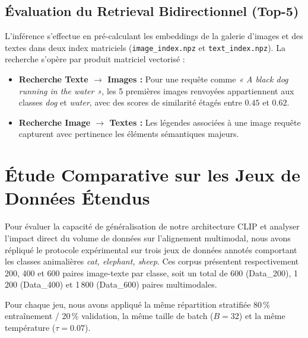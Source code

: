 \documentclass[12pt,a4paper]{article}
\begin{document}

\subsection{Évaluation du Retrieval Bidirectionnel (Top-5)}
L'inférence s'effectue en pré-calculant les embeddings de la galerie d'images et des textes dans deux index matriciels (\texttt{image\_index.npz} et \texttt{text\_index.npz}). La recherche s'opère par produit matriciel vectorisé :
\begin{itemize}
    \item \textbf{Recherche Texte $\rightarrow$ Images :} Pour une requête comme \textit{« A black dog running in the water »}, les 5 premières images renvoyées appartiennent aux classes \textit{dog} et \textit{water}, avec des scores de similarité étagés entre $0.45$ et $0.62$.
    \item \textbf{Recherche Image $\rightarrow$ Textes :} Les légendes associées à une image requête capturent avec pertinence les éléments sémantiques majeurs.
\end{itemize}

\section{Étude Comparative sur les Jeux de Données Étendus}

Pour évaluer la capacité de généralisation de notre architecture CLIP et analyser l'impact direct du volume de données sur l'alignement multimodal, nous avons répliqué le protocole expérimental sur trois jeux de données annotés comportant les classes animalières \textit{cat, elephant, sheep}. Ces corpus présentent respectivement 200, 400 et 600 paires image-texte par classe, soit un total de 600 (Data\_200), 1\,200 (Data\_400) et 1\,800 (Data\_600) paires multimodales.

Pour chaque jeu, nous avons appliqué la même répartition stratifiée 80\,\% entraînement / 20\,\% validation, la même taille de batch ($B=32$) et la même température ($\tau=0.07$).
\end{document}
